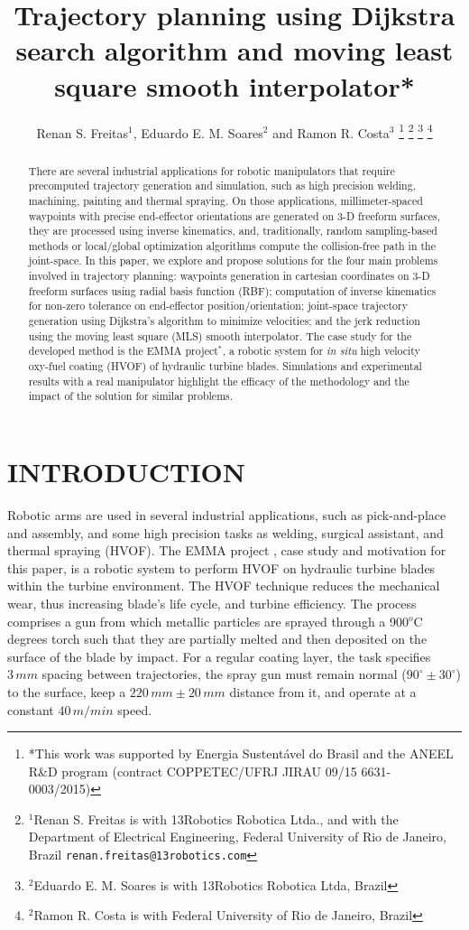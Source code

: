 \documentclass[letterpaper, 10 pt, conference]{ieeeconf}  %
\title{\LARGE \bf
Trajectory planning using Dijkstra search algorithm and moving
least square smooth interpolator* }
\author{Renan S. Freitas$^{1}$, Eduardo E. M. Soares$^{2}$ and Ramon R.
Costa$^{3}$%
\thanks{*This work was supported by Energia Sustent{\'a}vel do Brasil and the ANEEL R\&D program (contract
COPPETEC/UFRJ JIRAU 09/15 6631-0003/2015)}%
\thanks{$^{1}$Renan S. Freitas is with 13Robotics Robotica Ltda., and
with the Department of Electrical Engineering, Federal University of Rio de
Janeiro, Brazil {\tt\small renan.freitas@13robotics.com}}%
\thanks{$^{2}$Eduardo E. M. Soares is with 13Robotics Robotica Ltda, Brazil}%
\thanks{$^{2}$Ramon R. Costa is with Federal University of Rio de
Janeiro, Brazil}}
\begin{document}
\maketitle
\thispagestyle{empty}
\pagestyle{empty}


\begin{abstract}
There are several industrial applications for robotic manipulators that require
precomputed trajectory generation and simulation, such as high precision
welding, machining, painting and thermal spraying. On those applications,
millimeter-spaced waypoints with precise end-effector orientations are generated
on 3-D freeform surfaces, they are processed using inverse kinematics, and,
traditionally, random sampling-based methods or local/global optimization
algorithms compute the collision-free path in the joint-space. In this paper, we
explore and propose solutions for the four main problems involved in trajectory
planning: waypoints generation in cartesian coordinates on 3-D freeform surfaces
using radial basis function (RBF); computation of inverse kinematics for
non-zero tolerance on end-effector position/orientation; joint-space trajectory
generation using Dijkstra's algorithm to minimize velocities; and the jerk
reduction using the moving least square (MLS) smooth interpolator. The case
study for the developed method is the EMMA project$^*$, a robotic system for
\textit{in situ} high velocity oxy-fuel coating (HVOF) of hydraulic turbine
blades. Simulations and experimental results with a real manipulator highlight
the efficacy of the methodology and the impact of the solution for similar
problems.
\end{abstract}


\section{INTRODUCTION}\label{sec:intro}

Robotic arms are used in several industrial applications, such as pick-and-place
and assembly, and some high precision tasks as welding, surgical assistant, and
thermal spraying (HVOF). The EMMA project \cite{c1}, case study and motivation
for this paper, is a robotic system to perform HVOF on hydraulic turbine blades
within the turbine environment. The HVOF technique reduces the mechanical wear,
thus increasing blade's life cycle, and turbine efficiency. The process
comprises a gun from which metallic particles are sprayed through a 900$^o$C
degrees torch such that they are partially melted and then deposited on the
surface of the blade by impact. For a regular coating layer, the task specifies
$3\,mm$ spacing between trajectories, the spray gun must remain normal
($90^\circ \pm 30^\circ$) to the surface, keep a $220\,mm \pm 20\,mm $ distance
from it, and operate at a constant $40\,m/min$ speed.
\end{document}
